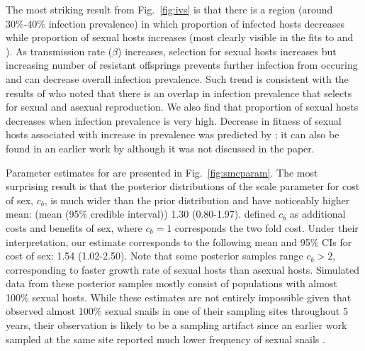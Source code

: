 \documentclass{article}\usepackage[]{graphicx}\usepackage[]{color}
\newcommand{\fref}[1]{Fig.~\ref{fig:#1}}
\begin{document}
The most striking result from \fref{ivs} is that there is a region (around 30\%-40\% infection prevalence) in which proportion of infected hosts decreases while proportion of sexual hosts increases (most clearly visible in the fits to \cite{mckone2016fine} and \cite{vergara2014infection}).
As transmission rate ($\beta$) increases, selection for sexual hosts increases but increasing number of resistant offsprings prevents further infection from occuring and can decrease overall infection prevalence.
Such trend is consistent with the results of \cite{lively2001trematode} who noted that there is an overlap in infection prevalence that selects for sexual and asexual reproduction.
We also find that proportion of sexual hosts decreases when infection prevalence is very high.
Decrease in fitness of sexual hosts associated with increase in prevalence was predicted by \cite{ashby2015diversity}; 
it can also be found in an earlier work by \cite{lively2010epidemiological} although it was not discussed in the paper.

Parameter estimates for \cite{vergara2014infection} are presented in \fref{smcparam}.
The most surprising result is that the posterior distributions of the scale parameter for cost of sex, $c_b$, is much wider than the prior distribution and have noticeably higher mean: (mean (95\% credible interval)) 1.30 (0.80-1.97).
\cite{ashby2015diversity} defined $c_b$ as additional costs and benefits of sex, where $c_b=1$ corresponds the two fold cost.
Under their interpretation, our estimate corresponds to the following mean and 95\% CIs for cost of sex: 1.54 (1.02-2.50).
Note that some posterior samples range $c_b > 2$, corresponding to faster growth rate of sexual hosts than asexual hosts.
Simulated data from these posterior samples mostly consist of populations with almost 100\% sexual hosts.
While these estimates are not entirely impossible given that \cite{vergara2014infection} observed almost 100\% sexual snails in one of their sampling sites throughout 5 years, their observation is likely to be a sampling artifact since an earlier work sampled at the same site reported much lower frequency of sexual snails \citep{vergara2013geographic}. %
\end{document}
